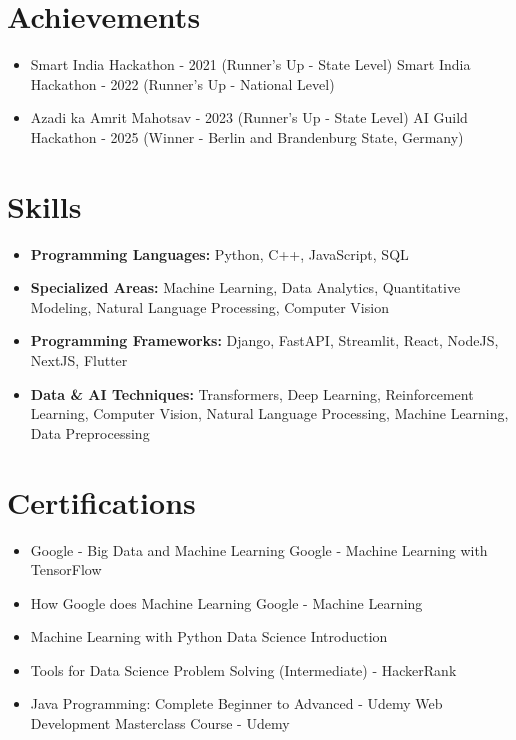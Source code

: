 \documentclass[a4paper,10pt]{article}
\begin{document}
\section*{Achievements}
\begin{itemize}
\item Smart India Hackathon - 2021 (Runner's Up - State Level) \hfill Smart India Hackathon - 2022 (Runner's Up - National Level)
\item Azadi ka Amrit Mahotsav - 2023 (Runner's Up - State Level) \hfill AI Guild Hackathon - 2025 (Winner - Berlin and Brandenburg State, Germany)
\end{itemize}

\section*{Skills}
\begin{itemize}
  \item \textbf{Programming Languages:} Python, C++, JavaScript, SQL
  \item \textbf{Specialized Areas:} Machine Learning, Data Analytics, Quantitative Modeling, Natural Language Processing, Computer Vision
  \item \textbf{Programming Frameworks:} Django, FastAPI, Streamlit, React, NodeJS, NextJS, Flutter
  \item \textbf{Data \& AI Techniques:} Transformers, Deep Learning, Reinforcement Learning, Computer Vision, Natural Language Processing, Machine Learning, Data Preprocessing
\end{itemize}

\section*{Certifications}
\begin{itemize}
\item Google - Big Data and Machine Learning \hfill Google - Machine Learning with TensorFlow
\item How Google does Machine Learning \hfill Google - Machine Learning
\item Machine Learning with Python \hfill Data Science Introduction
\item Tools for Data Science \hfill Problem Solving (Intermediate) - HackerRank
\item Java Programming: Complete Beginner to Advanced - Udemy \hfill Web Development Masterclass Course - Udemy
\end{itemize}
\end{document}
